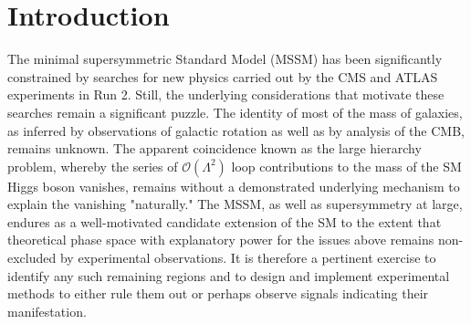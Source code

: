 \clearpage
\section{Introduction}
\label{sec:search-introduction}

The minimal supersymmetric Standard Model (MSSM) has been significantly constrained by searches for new physics carried out by the CMS and ATLAS experiments in Run 2. Still, the underlying considerations that motivate these searches remain a significant puzzle. The identity of most of the mass of galaxies, as inferred by observations of galactic rotation as well as by analysis of the CMB, remains unknown. The apparent coincidence known as the large hierarchy problem, whereby the series of $\mathcal{O}(\Lambda^2)$ loop contributions to the mass of the SM Higgs boson vanishes, remains without a demonstrated underlying mechanism to explain the vanishing "naturally." The MSSM, as well as supersymmetry at large, endures as a well-motivated candidate extension of the SM to the extent that theoretical phase space with explanatory power for the issues above remains non-excluded by experimental observations. It is therefore a pertinent exercise to identify any such remaining regions and to design and implement experimental methods to either rule them out or perhaps observe signals indicating their manifestation.

